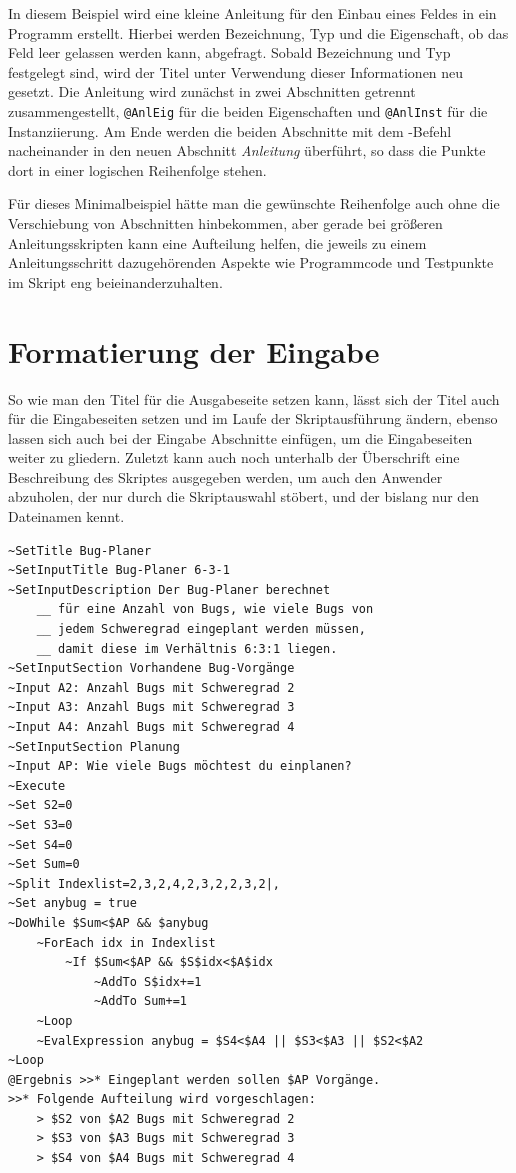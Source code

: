 In diesem Beispiel wird eine kleine Anleitung für den Einbau eines Feldes in ein Programm erstellt. Hierbei werden Bezeichnung, Typ und die Eigenschaft, ob das Feld leer gelassen werden kann, abgefragt. Sobald Bezeichnung und Typ festgelegt sind, wird der Titel unter Verwendung dieser Informationen neu gesetzt. Die Anleitung wird zunächst in zwei Abschnitten getrennt zusammengestellt, \verb|@AnlEig| für die beiden Eigenschaften und \verb|@AnlInst| für die Instanziierung. Am Ende werden die beiden Abschnitte  mit dem -Befehl nacheinander in den neuen Abschnitt \emph{Anleitung} überführt, so dass die Punkte dort in einer logischen Reihenfolge stehen.

Für dieses Minimalbeispiel hätte man die gewünschte Reihenfolge auch ohne die Verschiebung von Abschnitten hinbekommen, aber gerade bei größeren Anleitungsskripten kann eine Aufteilung helfen, die jeweils zu einem Anleitungsschritt dazugehörenden Aspekte wie Programmcode und Testpunkte im Skript eng beieinanderzuhalten.

\section{Formatierung der Eingabe}\label{FormatierungDerEingabe}
So wie man den Titel für die Ausgabeseite setzen kann, lässt sich der Titel auch für die Eingabeseiten setzen und im Laufe der Skriptausführung ändern, ebenso lassen sich auch bei der Eingabe Abschnitte einfügen, um die Eingabeseiten weiter zu gliedern. Zuletzt kann auch noch unterhalb der Überschrift eine Beschreibung des Skriptes ausgegeben werden, um auch den Anwender abzuholen, der nur durch die Skriptauswahl stöbert, und der bislang nur den Dateinamen kennt.

\label{BspBugPlaner}
\begin{verbatim}
~SetTitle Bug-Planer
~SetInputTitle Bug-Planer 6-3-1
~SetInputDescription Der Bug-Planer berechnet
    __ für eine Anzahl von Bugs, wie viele Bugs von
    __ jedem Schweregrad eingeplant werden müssen,
    __ damit diese im Verhältnis 6:3:1 liegen.
~SetInputSection Vorhandene Bug-Vorgänge
~Input A2: Anzahl Bugs mit Schweregrad 2
~Input A3: Anzahl Bugs mit Schweregrad 3
~Input A4: Anzahl Bugs mit Schweregrad 4
~SetInputSection Planung
~Input AP: Wie viele Bugs möchtest du einplanen?
~Execute
~Set S2=0
~Set S3=0
~Set S4=0
~Set Sum=0
~Split Indexlist=2,3,2,4,2,3,2,2,3,2|,
~Set anybug = true
~DoWhile $Sum<$AP && $anybug
    ~ForEach idx in Indexlist
        ~If $Sum<$AP && $S$idx<$A$idx
            ~AddTo S$idx+=1        
            ~AddTo Sum+=1
    ~Loop
    ~EvalExpression anybug = $S4<$A4 || $S3<$A3 || $S2<$A2
~Loop
@Ergebnis >>* Eingeplant werden sollen $AP Vorgänge.
>>* Folgende Aufteilung wird vorgeschlagen:
    > $S2 von $A2 Bugs mit Schweregrad 2
    > $S3 von $A3 Bugs mit Schweregrad 3
    > $S4 von $A4 Bugs mit Schweregrad 4
\end{verbatim}

